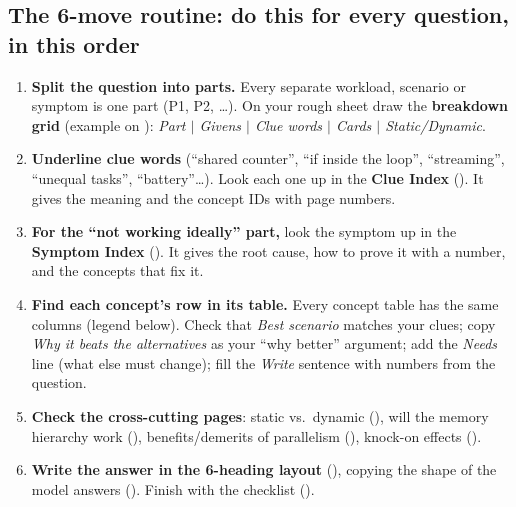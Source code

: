 \subsection*{The 6-move routine: do this for every question, in this order}
\begin{enumerate}[label=\textbf{\arabic*.}]
\item \textbf{Split the question into parts.} Every separate workload, scenario or symptom is one part (P1, P2, \ldots). On your rough sheet draw the \textbf{breakdown grid} (example on ): \emph{Part $|$ Givens $|$ Clue words $|$ Cards $|$ Static/Dynamic}.
\item \textbf{Underline clue words} (``shared counter'', ``if inside the loop'', ``streaming'', ``unequal tasks'', ``battery''\ldots). Look each one up in the \textbf{Clue Index} (). It gives the meaning and the concept IDs with page numbers.
\item \textbf{For the ``not working ideally'' part,} look the symptom up in the \textbf{Symptom Index} (). It gives the root cause, how to prove it with a number, and the concepts that fix it.
\item \textbf{Find each concept's row in its table.} Every concept table has the same columns (legend below). Check that \emph{Best scenario} matches your clues; copy \emph{Why it beats the alternatives} as your ``why better'' argument; add the \emph{Needs} line (what else must change); fill the \emph{Write} sentence with numbers from the question.
\item \textbf{Check the cross-cutting pages}: static vs.\ dynamic (), will the memory hierarchy work (), benefits/demerits of parallelism (), knock-on effects ().
\item \textbf{Write the answer in the 6-heading layout} (), copying the shape of the model answers (). Finish with the checklist ().
\end{enumerate}

